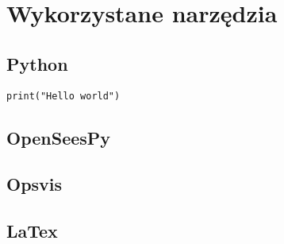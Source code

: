 \newpage
\section{Wykorzystane narzędzia}

\subsection{Python}

\begin{lstlisting}
print("Hello world")
\end{lstlisting}

\subsection{OpenSeesPy}
\subsection{Opsvis}
\subsection{LaTex}